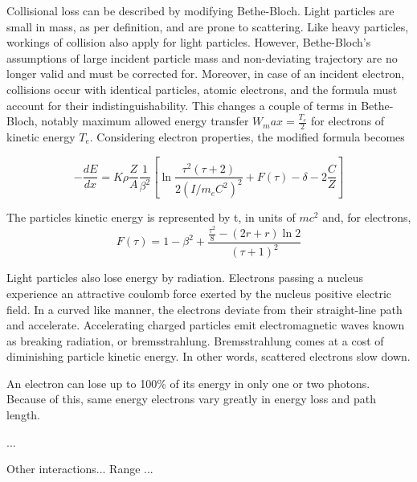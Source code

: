 Collisional loss can be described by modifying Bethe-Bloch. Light particles are small in mass, as per definition, and are prone to scattering. Like heavy particles, workings of collision also apply for light particles. However, Bethe-Bloch’s assumptions of large incident particle mass and non-deviating trajectory are no longer valid and must be corrected for. Moreover, in case of an incident electron, collisions occur with identical particles, atomic electrons, and the formula must account for their indistinguishability. This changes a couple of terms in Bethe-Bloch, notably maximum allowed energy transfer $W_max = \frac{T_e}{2}$ for electrons of kinetic energy $T_e$. Considering electron properties, the modified formula becomes

    \begin{equation}
        - \frac{dE}{dx} = K \rho \frac{Z}{A} \frac{1}{\beta^2}
                          \left[
                          \ln{\frac{\tau^2(\tau+2)}{2(I/m_eC^2)^2}}+F(\tau) - \delta-2\frac{C}{Z}
                          \right]
    \end{equation}

The particles kinetic energy is represented by t, in units of $mc^2$ and, for electrons,
    \begin{equation}
      F(\tau) = 1- \beta^2+\frac{\frac{\tau^2}{8}-(2r+r)\ln{2} }{(\tau+1)^2}
    \end{equation}

Light particles also lose energy by radiation. Electrons passing a nucleus experience an attractive coulomb force exerted by the nucleus positive electric field. In a curved like manner, the electrons deviate from their straight-line path and accelerate. Accelerating charged particles emit electromagnetic waves known as breaking radiation, or bremsstrahlung. Bremsstrahlung comes at a cost of diminishing particle kinetic energy. In other words, scattered electrons slow down.

An electron can lose up to 100\% of its energy in only one or two photons. Because of this, same energy electrons vary greatly in energy loss and path length.

...

Other interactions...
Range ...

